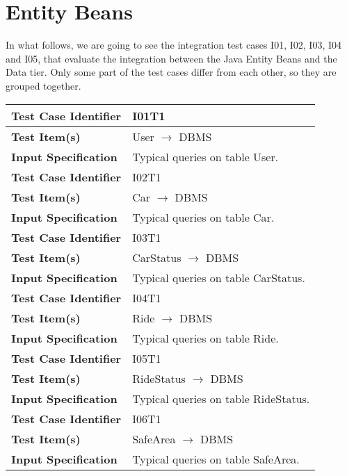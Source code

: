 \section{Entity Beans}

In what follows, we are going to see the integration test cases I01, I02, I03, I04 and I05, that evaluate the integration between the Java Entity Beans and the Data tier.
Only some part of the test cases differ from each other, so they are grouped together.

\vspace{2em}

\begin{tabular}{l p{}}
    \hline
    \textbf{Test Case Identifier} & I01T1\\
    \hline
    \textbf{Test Item(s)} & User $\rightarrow$ DBMS \\
    \hline
    \textbf{Input Specification} & Typical queries on table User. \\
    \hline
    \hline
    \textbf{Test Case Identifier} & I02T1\\
    \hline
    \textbf{Test Item(s)} & Car $\rightarrow$ DBMS \\
    \hline
    \textbf{Input Specification} & Typical queries on table Car. \\
    \hline
    \hline
    \textbf{Test Case Identifier} & I03T1\\
    \hline
    \textbf{Test Item(s)} & CarStatus $\rightarrow$ DBMS \\
    \hline
    \textbf{Input Specification} & Typical queries on table CarStatus. \\
    \hline
    \hline
    \textbf{Test Case Identifier} & I04T1\\
    \hline
    \textbf{Test Item(s)} & Ride $\rightarrow$ DBMS \\
    \hline
    \textbf{Input Specification} & Typical queries on table Ride. \\
    \hline
    \hline
    \textbf{Test Case Identifier} & I05T1\\
    \hline
    \textbf{Test Item(s)} & RideStatus $\rightarrow$ DBMS \\
    \hline
    \textbf{Input Specification} & Typical queries on table RideStatus. \\
    \hline
    \hline
    \textbf{Test Case Identifier} & I06T1\\
    \hline
    \textbf{Test Item(s)} & SafeArea $\rightarrow$ DBMS \\
    \hline
    \textbf{Input Specification} & Typical queries on table SafeArea. \\

\end{tabular}
